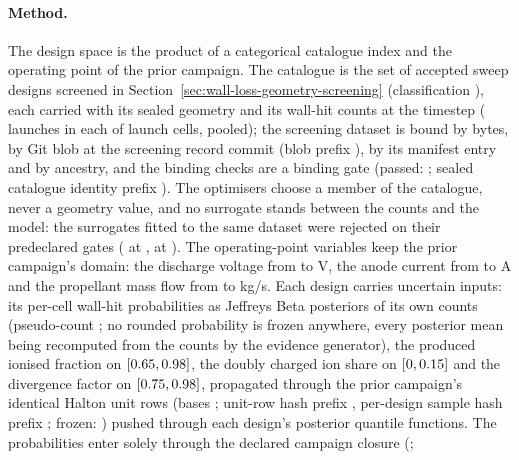 \paragraph{Method.}
The design space is the product of a categorical catalogue index and the operating
point of the prior campaign. The catalogue is the set of \MdbCatalogueSize{} accepted
sweep designs screened in Section~\ref{sec:wall-loss-geometry-screening}
(classification \texttt{\MdbScreeningClassification}), each carried with its sealed
geometry and its wall-hit counts at the \texttt{\MdbReportedCase} timestep
(\MdbCellTrials{} launches in each of \MdbCellCount{} launch cells, \MdbPooledTrials{}
pooled); the screening dataset is bound by bytes, by Git blob at the screening record
commit \texttt{\MdbScreeningResultsCommit} (blob prefix
\texttt{\MdbScreeningDatasetBlob}), by its manifest entry and by ancestry, and the
\MdbCatalogueBindingChecks{} binding checks are a binding gate (passed:
\MdbCatalogueBindingPassed; sealed catalogue identity prefix
\texttt{\MdbCatalogueSha}). The optimisers choose a member of the catalogue, never a
geometry value, and no surrogate stands between the counts and the model: the
\MdbRejectedSurrogates{} surrogates fitted to the same dataset were rejected on their
predeclared gates (\texttt{\MdbSurrogateOneOutcome} at \texttt{\MdbSurrogateOneCommit},
\texttt{\MdbSurrogateTwoOutcome} at \texttt{\MdbSurrogateTwoCommit}). The
\MdbOperatingVariableCount{} operating-point variables keep the prior campaign's
domain: the discharge voltage from \MdbUaLower{} to \MdbUaUpper{} V, the anode current
from \MdbIaLower{} to \MdbIaUpper{} A and the propellant mass flow from \MdbMdotLower{}
to \MdbMdotUpper{} kg/s. Each design carries \MdbUncertainInputCount{} uncertain inputs:
its \MdbCellCount{} per-cell wall-hit probabilities as Jeffreys Beta posteriors of its
own counts (pseudo-count \MdbJeffreysPrior; no rounded probability is frozen anywhere,
every posterior mean being recomputed from the counts by the evidence generator), the
produced ionised fraction on $[0.65, 0.98]$, the doubly charged ion
share on $[0, 0.15]$ and the divergence factor on
$[0.75, 0.98]$, propagated through the prior campaign's identical
\MdbSampleCount{} Halton unit rows (bases \MdbSampleBases; unit-row hash prefix
\texttt{\MdbUnitRowsSha}, per-design sample hash prefix
\texttt{\MdbCatalogueSampleSha}; frozen: \MdbSampleFrozen) pushed through each
design's posterior quantile functions. The probabilities enter solely through the
declared campaign closure \texttt{\MdbClosureId} (\MdbClosureShort;
